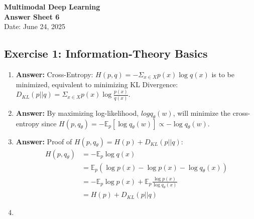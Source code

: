 \documentclass[11pt]{article}
\begin{document}
\begin{center}
    {\Large \textbf{Multimodal Deep Learning}} \\ [0.3em]
    {\large \textbf{Answer Sheet 6}} \\ [0.3em]
    \large Date: June 24, 2025
\end{center}

\vspace{1cm}

\subsection*{Exercise 1: Information-Theory Basics}

\begin{enumerate}[label=(\alph*)]
    \item {
        \textbf{Answer: } Cross-Entropy: \(H(p,q) = - \Sigma_{x \in X} p(x) \log q(x)\) is to be minimized, equivalent to minimizing KL Divergence: \(D_{KL}(p||q) = \Sigma_{x \in X} p(x) \log \frac{p(x)}{q(x)}\).
    }
    \item {
        \textbf{Answer: } By maximizing log-likelihood, \(log q_\theta(w)\), will minimize the cross-entropy since \(H(p,q_\theta) = -\mathbb{E}_p[\log q_\theta(w)] \propto -\log q_\theta(w)\).
    }
    \item \textbf{Answer: } Proof of \(H(p,q_\theta) = H(p) + D_{KL}(p||q)\): {
        \begin{align*}
            H(p,q_\theta) &= -\mathbb{E}_p \log q(x) \\
                          &= \mathbb{E}_p (\log p(x) - \log p(x) - \log q_\theta(x)) \\
                          &= -\mathbb{E}_p \log p(x) + \mathbb{E}_p \frac{\log p(x)}{\log q_\theta(x)} \\
                          &= H(p) + D_{KL}(p||q)
        \end{align*}
    }
    \item 
\end{enumerate}
\end{document}
